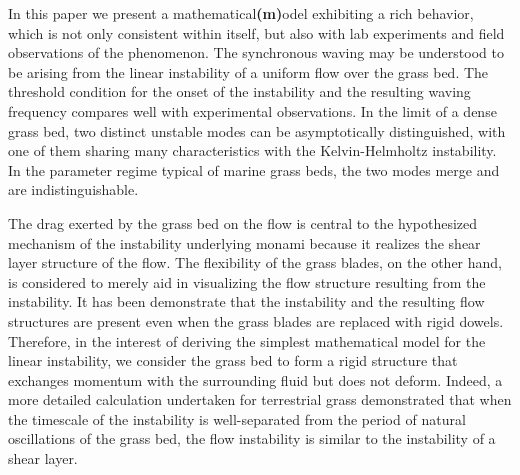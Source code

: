 \documentclass[aps,prl,reprint,twocolumn,showpacs,superscriptaddress,10pt]{revtex4-1}  %
\newcommand{\shreyas}[1]{{\bf (#1)}}
\begin{document}
In this paper we present a mathematical\shreyas model exhibiting a rich behavior, which is not only consistent within itself, but also with lab experiments and field observations of the phenomenon.
The synchronous waving may be understood to be arising from the linear instability of a uniform flow over the grass bed. 
The threshold condition for the onset of the instability and the resulting waving frequency compares well with experimental observations.
In the limit of a dense grass bed, two distinct unstable modes can be asymptotically distinguished, with one of them sharing many characteristics with the Kelvin-Helmholtz instability. 
In the parameter regime typical of marine grass beds, the two modes merge and are indistinguishable.

The drag exerted by the grass bed on the flow is central to the hypothesized mechanism\cite{Ghisal02} of the instability underlying monami because it realizes the shear layer structure of the flow. 
The flexibility of the grass blades, on the other hand, is considered to merely aid in visualizing the flow structure resulting from the instability\cite{Nepf2012}. 
It has been demonstrate that the instability and the resulting flow structures are present even when the grass blades are replaced with rigid dowels\cite{Ghisal02}. 
Therefore, in the interest of deriving the simplest mathematical model for the linear instability, we consider the grass bed to form a rigid structure that exchanges momentum with the surrounding fluid but does not deform. 
Indeed, a more detailed calculation undertaken for terrestrial grass demonstrated\cite{Delangre06} that when the timescale of the instability is well-separated from the period of natural oscillations of the grass bed, the flow instability is similar to the instability of a shear layer. 
\end{document}
